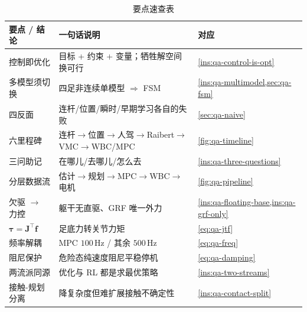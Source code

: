 \begin{table}[H]\centering\small
\caption{要点速查表}
\begin{tabular}{lll}
\toprule
要点 / 结论 & 一句话说明 & 对应 \\
\midrule
控制即优化 & 目标 + 约束 + 变量；牺牲解空间换可行 & \cref{ins:qa-control-is-opt} \\
多模型须切换 & 四足非连续单模型 $\Rightarrow$ FSM & \cref{ins:qa-multimodel,sec:qa-fsm} \\
四反面 & 连杆/位置/瞬时/早期学习各自的失败 & \cref{sec:qa-naive} \\
六里程碑 & 连杆$\to$位置$\to$人驾$\to$Raibert$\to$VMC$\to$WBC/MPC & \cref{fig:qa-timeline} \\
三问助记 & 在哪儿/去哪儿/怎么去 & \cref{ins:qa-three-questions} \\
分层数据流 & 估计$\to$规划$\to$MPC$\to$WBC$\to$电机 & \cref{fig:qa-pipeline} \\
欠驱 $\to$ 力控 & 躯干无直驱、GRF 唯一外力 & \cref{ins:qa-floating-base,ins:qa-grf-only} \\
$\boldsymbol\tau=\mathbf{J}^\top\mathbf{f}$ & 足底力转关节力矩 & \cref{eq:qa-jtf} \\
频率解耦 & MPC $100\,\mathrm{Hz}$ / 其余 $500\,\mathrm{Hz}$ & \cref{eq:qa-freq} \\
阻尼保护 & 危险态纯速度阻尼平稳停机 & \cref{eq:qa-damping} \\
两流派同源 & 优化与 RL 都是求最优策略 & \cref{ins:qa-two-streams} \\
接触-规划分离 & 降复杂度但难扩展接触不确定性 & \cref{ins:qa-contact-split} \\
\bottomrule
\end{tabular}
\end{table}

